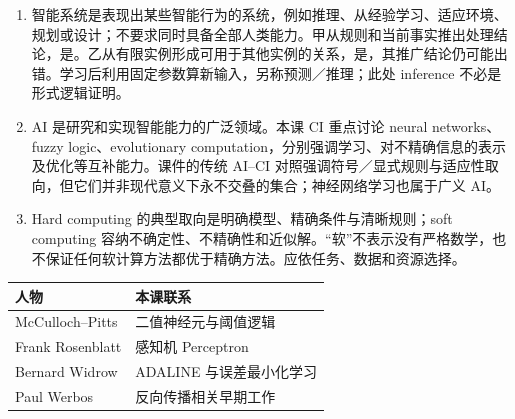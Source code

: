 \solve
\begin{enumerate}
\item 智能系统是表现出某些智能行为的系统，例如推理、从经验学习、适应环境、规划或设计；不要求同时具备全部人类能力。甲从规则和当前事实推出处理结论，是。乙从有限实例形成可用于其他实例的关系，是，其推广结论仍可能出错。学习后利用固定参数算新输入，另称预测／推理；此处 inference 不必是形式逻辑证明。
\item AI 是研究和实现智能能力的广泛领域。本课 CI 重点讨论 neural networks、fuzzy logic、evolutionary computation，分别强调学习、对不精确信息的表示及优化等互补能力。课件的传统 AI--CI 对照强调符号／显式规则与适应性取向，但它们并非现代意义下永不交叠的集合；神经网络学习也属于广义 AI。
\item Hard computing 的典型取向是明确模型、精确条件与清晰规则；soft computing 容纳不确定性、不精确性和近似解。“软”不表示没有严格数学，也不保证任何软计算方法都优于精确方法。应依任务、数据和资源选择。
\end{enumerate}
\begin{center}\begin{tabular}{ll}\toprule
人物 & 本课联系\\\midrule
McCulloch--Pitts & 二值神经元与阈值逻辑\\
Frank Rosenblatt & 感知机 Perceptron\\
Bernard Widrow & ADALINE 与误差最小化学习\\
Paul Werbos & 反向传播相关早期工作\\\bottomrule
\end{tabular}\end{center}

